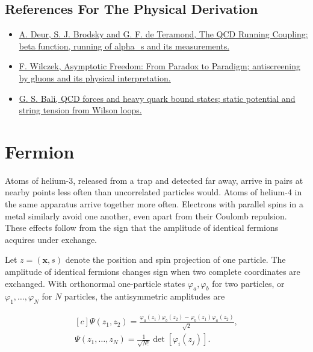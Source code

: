 \documentclass[11pt,oneside]{book}
\newenvironment{centeredalign}{\[\begin{gathered}[c]}{\end{gathered}\]}
\begin{document}
\subsection*{References For The Physical Derivation}
\begin{itemize}
\item \href{https://arxiv.org/abs/1604.08082}{A. Deur, S. J. Brodsky and G. F. de Teramond, The QCD Running Coupling; beta function, running of alpha\_s and its measurements.}
\item \href{https://arxiv.org/abs/hep-ph/0502113}{F. Wilczek, Asymptotic Freedom: From Paradox to Paradigm; antiscreening by gluons and its physical interpretation.}
\item \href{https://arxiv.org/abs/hep-ph/0001312}{G. S. Bali, QCD forces and heavy quark bound states; static potential and string tension from Wilson loops.}
\end{itemize}





\clearpage

\section{Fermion}

\label{topic:fermion}

Atoms of helium-3, released from a trap and detected far away, arrive in pairs at nearby points less often than uncorrelated particles would. Atoms of helium-4 in the same apparatus arrive together more often. Electrons with parallel spins in a metal similarly avoid one another, even apart from their Coulomb repulsion. These effects follow from the sign that the amplitude of identical fermions acquires under exchange.

Let \(z=(\mathbf x,s)\) denote the position and spin projection of one particle. The amplitude of identical fermions changes sign when two complete coordinates are exchanged. With orthonormal one-particle states \(\varphi_a,\varphi_b\) for two particles, or \(\varphi_1,\dots,\varphi_N\) for \(N\) particles, the antisymmetric amplitudes are

\begin{centeredalign}
\Psi(z_1,z_2)=\frac{\varphi_a(z_1)\varphi_b(z_2)-\varphi_b(z_1)\varphi_a(z_2)}{\sqrt2},\\
\Psi(z_1,\dots,z_N)=\frac{1}{\sqrt{N!}}\det\left[\varphi_i(z_j)\right].
\end{centeredalign}
\end{document}
